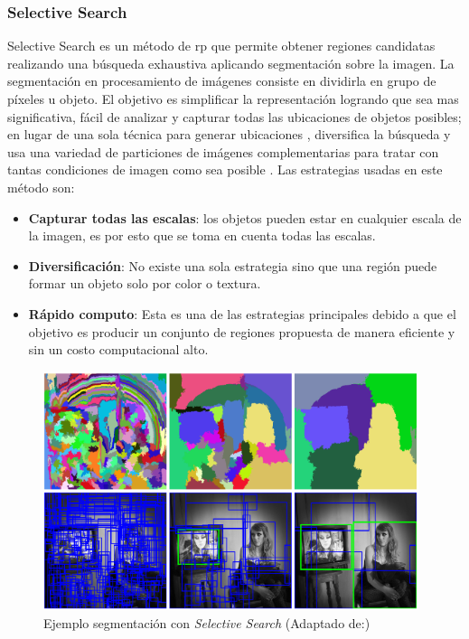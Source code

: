 \subsubsection*{Selective Search} \label{sub:selectivesearch}
Selective Search es un método de \ac{rp} que  permite obtener regiones candidatas realizando una búsqueda exhaustiva aplicando segmentación sobre la imagen. La segmentación  en procesamiento de imágenes consiste en dividirla en grupo de píxeles u objeto. El objetivo es simplificar la representación logrando que sea mas significativa, fácil de analizar y capturar todas las ubicaciones de objetos posibles; en lugar de una sola técnica para generar ubicaciones , diversifica la  búsqueda y usa  una variedad de particiones de imágenes complementarias para tratar con tantas condiciones de imagen como sea posible \citep{selectivesearch}.
Las estrategias usadas en este método son:
\begin{itemize}
\item \textbf{Capturar todas las escalas}: los objetos pueden estar en cualquier escala de la imagen, es por esto que se toma en cuenta todas las escalas.
\item \textbf{Diversificación}: No existe una sola estrategia sino que una región puede formar un objeto solo por color o textura.
\item \textbf{Rápido computo}: Esta es una de las estrategias principales debido a que el objetivo es producir un conjunto de regiones propuesta de manera eficiente y sin un costo computacional alto.
\end{itemize}

\begin{figure}[h]
 \centering
  \includegraphics[height=7cm,keepaspectratio=true,clip=true]{imagenes/Logos/selectivesearch.png}
  \caption{Ejemplo segmentación con \textit{Selective Search} (Adaptado de:\citep{selectivesearch})}
	\label{Fig: overlapping}
\end{figure}

